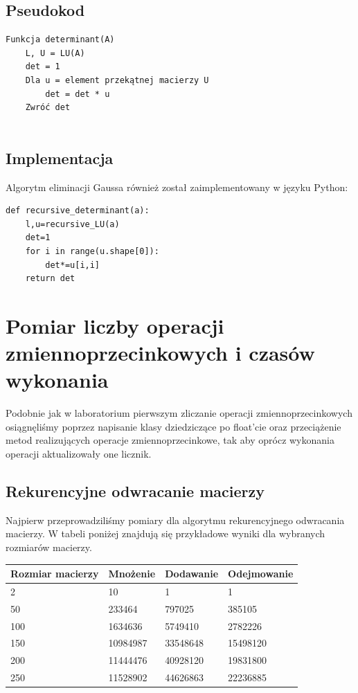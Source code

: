 \documentclass{article}
\begin{document}
\subsection{Pseudokod}

\begin{verbatim}
Funkcja determinant(A)
    L, U = LU(A)
    det = 1
    Dla u = element przekątnej macierzy U
        det = det * u
    Zwróć det
        
\end{verbatim}

\subsection{Implementacja}

Algorytm eliminacji Gaussa również został zaimplementowany w języku Python:

\begin{verbatim}
def recursive_determinant(a):
    l,u=recursive_LU(a)
    det=1
    for i in range(u.shape[0]):
        det*=u[i,i]
    return det

\end{verbatim}


\section{Pomiar liczby operacji zmiennoprzecinkowych i czasów wykonania}

Podobnie jak w laboratorium pierwszym zliczanie operacji zmiennoprzecinkowych osiągnęliśmy poprzez napisanie klasy dziedziczące po float'cie oraz przeciążenie metod realizujących operacje zmiennoprzecinkowe, tak aby oprócz wykonania operacji aktualizowały one licznik.

\subsection{Rekurencyjne odwracanie macierzy}

\noindent
Najpierw przeprowadziliśmy pomiary dla algorytmu rekurencyjnego odwracania macierzy. W tabeli poniżej znajdują się przykładowe wyniki dla wybranych rozmiarów macierzy.

\begin{table}[!ht]
    \centering
    \begin{tabular}{|l|l|l|l|}
    \hline
        Rozmiar macierzy & Mnożenie & Dodawanie & Odejmowanie \\ \hline
        2 & 10 & 1 & 1 \\ \hline
        50 & 233464 & 797025 & 385105 \\ \hline
        100 & 1634636 & 5749410 & 2782226 \\ \hline
        150 & 10984987 & 33548648 & 15498120 \\ \hline
        200 & 11444476 & 40928120 & 19831800 \\ \hline
        250 & 11528902 & 44626863 & 22236885 \\ \hline
    \end{tabular}
\end{table}
\end{document}
